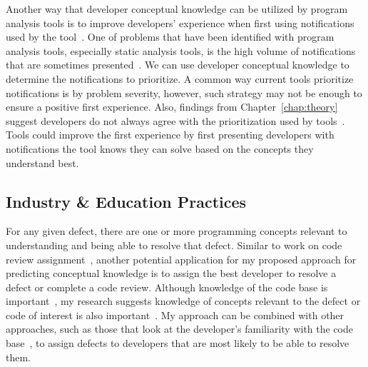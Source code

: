 Another way that developer conceptual knowledge can be utilized by program analysis tools is to improve developers' experience when first using notifications used by the tool~\cite{johnson2015bespoke}. One of problems that have been identified with program analysis tools, especially static analysis tools, is the high volume of notifications that are sometimes presented~\cite{Johnson:2013:Why}. We can use developer conceptual knowledge to determine the notifications to prioritize. A common way current tools prioritize notifications is by problem severity, however, such strategy may not be enough to ensure a positive first experience. Also, findings from Chapter~\ref{chap:theory} suggest developers do not always agree with the prioritization used by tools~\cite{johnson2016cross}. Tools could improve the first experience by first presenting developers with notifications the tool knows they can solve based on the concepts they understand best.

\subsection{Industry \& Education Practices}

For any given defect, there are one or more programming concepts relevant to understanding and being able to resolve that defect. Similar to work on code review assignment~\cite{balachandran2013reducing}, another potential application for my proposed approach for predicting conceptual knowledge is to assign the best developer to resolve a defect or complete a code review. Although knowledge of the code base is important~\cite{fritz2010degree}, my research suggests knowledge of concepts relevant to the defect or code of interest is also important~\cite{johnson2016cross}. My approach can be combined with other approaches, such as those that look at the developer's familiarity with the code base~\cite{fritz2010degree}, to assign defects to developers that are most likely to be able to resolve them. 	

